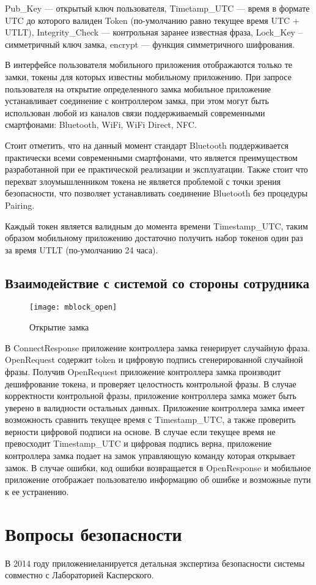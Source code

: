 \noindent Pub\_Key — открытый ключ пользователя, Timetamp\_UTC — время в формате UTC до которого валиден Token (по-умолчанию равно текущее время UTC + UTLT), Integrity\_Check — контрольная заранее известная фраза, Lock\_Key – симметричный ключ замка, encrypt — функция симметричного шифрования.

В интерфейсе пользователя мобильного приложения отображаются только те замки, токены для которых известны мобильному приложению. При запросе пользователя на открытие определенного замка мобильное приложение устанавливает соединение с контроллером замка, при этом могут быть использован любой из каналов связи поддерживаемый современными смартфонами: Bluetooth, WiFi, WiFi Direct, NFC.

Стоит отметить, что на данный момент стандарт Bluetooth поддерживается практически всеми современными смартфонами, что является преимуществом разработанной при ее практической реализации и эксплуатации. Также стоит что перехват злоумышленником токена не является проблемой с точки зрения безопасности, что позволяет устанавливать соединение Bluetooth без процедуры Pairing.

Каждый токен является валидным до момента времени Timestamp\_UTC, таким образом мобильному приложению достаточно получить набор токенов один раз за время UTLT (по-умолчанию 24 часа).

\subsection{Взаимодействие с системой со стороны сотрудника} \label{subsect2_4_2}

\begin{figure}[ht] %
	\centering
	\texttt{[image: mblock\_open]}\\ %
	\caption{Открытие замка}%
	\label{mblock_open}%
\end{figure}

В ConnectResponse приложение контроллера замка генерирует случайную фраза. OpenRequest содержит token и цифровую подпись сгенерированной случайной фразы. Получив OpenRequest приложение контроллера замка производит дешифрование токена, и проверяет целостность контрольной фразы. В случае корректности контрольной фразы, приложение контроллера замка может быть уверено в валидности остальных данных. Приложение контроллера замка имеет возможность сравнить текущее время с Timestamp\_UTC, а также проверить верности цифровой подписи на основе. В случае если текущее время не превосходит Timestamp\_UTC и цифровая подпись верна, приложение контроллера замка подает на замок управляющую команду которая открывает замок. В случае ошибки, код ошибки возвращается в OpenResponse и мобильное приложение отображает пользователю информацию об ошибке и возможные пути к ее устранению.

\section{Вопросы безопасности} \label{subsect2_5}
В 2014 году приложениеланируется детальная экспертиза безопасности системы совместно с Лабораторией Касперского.
\clearpage
